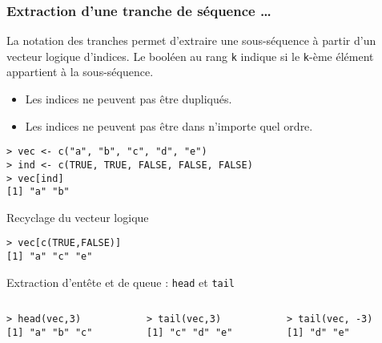 \documentclass[10pt]{beamer}
\begin{document}
\begin{frame}[fragile]
  \frametitle{Extraction d'une tranche de séquence \dots}
  La notation des tranches permet d’extraire une sous-séquence à partir d’un \alert{vecteur logique d’indices}.
  Le booléen au rang \texttt{k} indique si le \texttt{k}-ème élément appartient à la sous-séquence.
  \begin{itemize}
  \item Les indices ne peuvent pas être dupliqués.
  \item Les indices ne peuvent pas être dans n'importe quel ordre.
  \end{itemize}
  \begin{lstlisting}
> vec <- c("a", "b", "c", "d", "e")
> ind <- c(TRUE, TRUE, FALSE, FALSE, FALSE)
> vec[ind]
[1] "a" "b"
\end{lstlisting}

\begin{block}{Recyclage du vecteur logique}
  \begin{lstlisting}[style=block]
> vec[c(TRUE,FALSE)]
[1] "a" "c" "e"
  \end{lstlisting}
\end{block}
\begin{block}{Extraction d'entête et de queue : \texttt{head} et \texttt{tail}}


\begin{columns}[t]
\begin{column}{0.33\textwidth}
  \begin{lstlisting}
> head(vec,3)
[1] "a" "b" "c"
\end{lstlisting}
\end{column}
\begin{column}{0.33\textwidth}
  \begin{lstlisting}
> tail(vec,3)
[1] "c" "d" "e"
\end{lstlisting}
\end{column}
\begin{column}{0.33\textwidth}
  \begin{lstlisting}
> tail(vec, -3)
[1] "d" "e"
\end{lstlisting}
\end{column}
\end{columns}
\end{block}
\end{frame}
\end{document}
